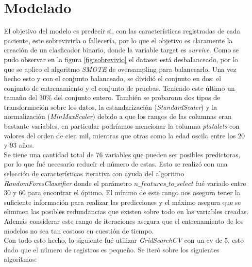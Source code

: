 \documentclass[6pt, twocolumn]{article}
\begin{document}
\section{Modelado}
El objetivo del modelo es predecir si, con las características registradas de cada paciente, este sobreviviría o fallecería, por lo que el objetivo es claramente la creación de un clasficador binario, donde la variable target es \textit{survive}. Como se pudo observar en la figura \ref{fig:sobrevivio} el dataset está desbalanceado, por lo que se aplico el algoritmo \textit{SMOTE} de oversampling para balancearlo. Una vez hecho esto y con el conjunto balanceado, se dividió el conjunto en dos: el conjunto de entrenamiento y el conjunto de pruebas. Teniendo este último un tama\~no del $30\%$ del conjunto entero. También se probaronn dos tipos de transformación sobre los datos, la estandarización (\textit{StandardScaler}) y la normalización (\textit{MinMaxScaler}) debido a que los rangos de las columnas eran bastante variables, en particular podríamos mencionar la columna \textit{platalets} con valores del orden de cien mil, mientras que otras como la edad oscila entre los $20$ y $93$ a\~nos.\\
Se tiene una cantidad total de 76 variables que pueden ser posibles predictoras, por lo que fué necesario reducir el número de estas. Esto se realizó con una selección de características iterativa con ayuda del algoritmo \textit{RandomForesClassifier} donde el parámetro $n\_features\_to\_select$ fué variado entre $30$ y $60$ para encontrar el óptimo. El mínimo de este rango nos asegura tener la suficiente información para realizar las predicciones y el máximo asegura que se eliminen las posibles redundancias que existen sobre todo en las variables creadas. Además considerar este rango de iteraciones asegura que el entrenamiento de los modelos no sea tan costoso en cuestión de tiempo. \\
Con todo esto hecho, lo siguiente fué utilizar \textit{GridSearchCV} con un cv de $5$, esto dado que el número de registros es peque\~no. Se iteró sobre los siguientes algoritmos:
\end{document}

